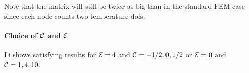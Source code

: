 Note that the matrix will still be twice as big than in the standard FEM case since 
each node counts two temperature dofs. 


\paragraph{Choice of ${\cal C}$ and ${\cal E}$} Li \cite{li06}
shows satisfying results for ${\cal E}=4$ and ${\cal C}=-1/2,0,1/2$ or 
${\cal E}=0$ and ${\cal C}=1,4,10$.







